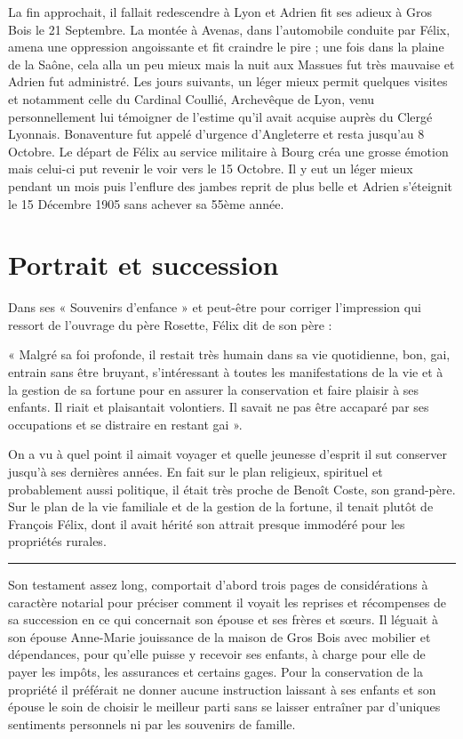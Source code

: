 \documentclass[11pt,a4paper]{report}
\begin{document}
La fin approchait, il fallait redescendre à Lyon et Adrien fit ses adieux à Gros Bois le 21 Septembre. La montée à Avenas, dans l'automobile conduite par Félix, amena une oppression angoissante et fit craindre le pire ; une fois dans la plaine de la Saône, cela alla un peu mieux mais la nuit aux Massues fut très mauvaise et Adrien fut administré. Les jours suivants, un léger mieux permit quelques visites et notamment celle du Cardinal Coullié, Archevêque de Lyon, venu personnellement lui témoigner de l'estime qu'il avait acquise auprès du Clergé Lyonnais. Bonaventure fut appelé d'urgence d'Angleterre et resta jusqu'au 8 Octobre. Le départ de Félix au service militaire à Bourg créa une grosse émotion mais celui-ci put revenir le voir vers le 15 Octobre. Il y eut un léger mieux pendant un mois puis l'enflure des jambes reprit de plus belle et Adrien s'éteignit le 15 Décembre 1905 sans achever sa 55ème année.


\chapter{Portrait et succession}\label{portrait-et-succession}

Dans ses « Souvenirs d'enfance » et peut-être pour corriger l'impression qui ressort de l'ouvrage du père Rosette, Félix dit de son père :

« Malgré sa foi profonde, il restait très humain dans sa vie quotidienne, bon, gai, entrain sans être bruyant, s'intéressant à toutes les manifestations de la vie et à la gestion de sa fortune pour en assurer la conservation et faire plaisir à ses enfants. Il riait et plaisantait volontiers. Il savait ne pas être accaparé par ses occupations et se distraire en restant gai ».

On a vu à quel point il aimait voyager et quelle jeunesse d'esprit il sut conserver jusqu'à ses dernières années. En fait sur le plan religieux, spirituel et probablement aussi politique, il était très proche de Benoît Coste, son grand-père. Sur le plan de la vie familiale et de la gestion de la fortune, il tenait plutôt de François Félix, dont il avait hérité son attrait presque immodéré pour les propriétés rurales.

\begin{center}\rule{0.5\linewidth}{0.5pt}\end{center}

Son testament assez long, comportait d'abord trois pages de considérations à caractère notarial pour préciser comment il voyait les reprises et récompenses de sa succession en ce qui concernait son épouse et ses frères et sœurs. Il léguait à son épouse Anne-Marie jouissance de la maison de Gros Bois avec mobilier et dépendances, pour qu'elle puisse y recevoir ses enfants, à charge pour elle de payer les impôts, les assurances et certains gages. Pour la conservation de la propriété il préférait ne donner aucune instruction laissant à ses enfants et son épouse le soin de choisir le meilleur parti sans se laisser entraîner par d'uniques sentiments personnels ni par les souvenirs de famille.
\end{document}
